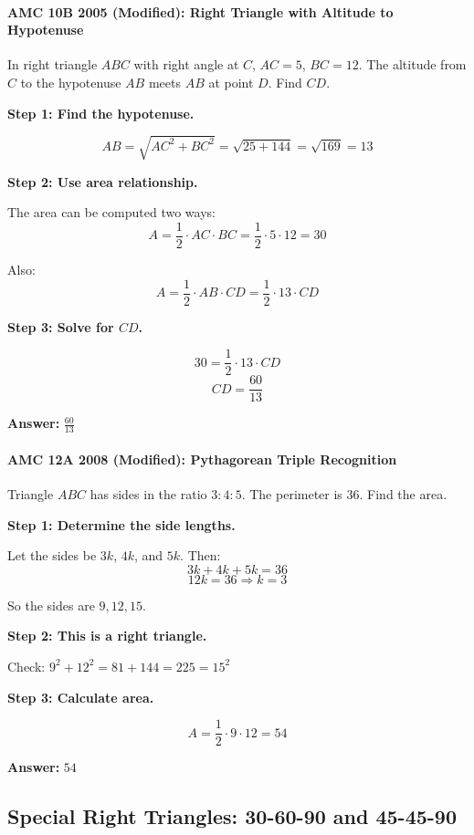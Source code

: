 ﻿\documentclass[12pt]{extarticle}
\begin{document}
\paragraph{AMC 10B 2005 (Modified): Right Triangle with Altitude to Hypotenuse}

In right triangle $ABC$ with right angle at $C$, $AC = 5$, $BC = 12$. The altitude from $C$ to the hypotenuse $AB$ meets $AB$ at point $D$. Find $CD$.

\begin{solutionbox}
\textbf{Step 1: Find the hypotenuse.}

\[AB = \sqrt{AC^2 + BC^2} = \sqrt{25 + 144} = \sqrt{169} = 13\]

\textbf{Step 2: Use area relationship.}

The area can be computed two ways:
\[A = \frac{1}{2} \cdot AC \cdot BC = \frac{1}{2} \cdot 5 \cdot 12 = 30\]

Also:
\[A = \frac{1}{2} \cdot AB \cdot CD = \frac{1}{2} \cdot 13 \cdot CD\]

\textbf{Step 3: Solve for $CD$.}

\[30 = \frac{1}{2} \cdot 13 \cdot CD\]
\[CD = \frac{60}{13}\]

\textbf{Answer:} $\boxed{\frac{60}{13}}$
\end{solutionbox}

\paragraph{AMC 12A 2008 (Modified): Pythagorean Triple Recognition}

Triangle $ABC$ has sides in the ratio $3:4:5$. The perimeter is 36. Find the area.

\begin{solutionbox}
\textbf{Step 1: Determine the side lengths.}

Let the sides be $3k$, $4k$, and $5k$. Then:
\[3k + 4k + 5k = 36\]
\[12k = 36 \Rightarrow k = 3\]

So the sides are $9, 12, 15$.

\textbf{Step 2: This is a right triangle.}

Check: $9^2 + 12^2 = 81 + 144 = 225 = 15^2$ \checkmark

\textbf{Step 3: Calculate area.}

\[A = \frac{1}{2} \cdot 9 \cdot 12 = 54\]

\textbf{Answer:} $\boxed{54}$
\end{solutionbox}

\subsection{Special Right Triangles: 30-60-90 and 45-45-90}
\end{document}
